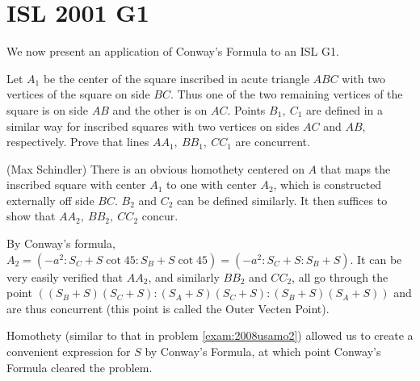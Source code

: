 \section{ISL 2001 G1}
\label{exam:2001islg1}
We now present an application of Conway's Formula to an ISL G1.

\secps


\begin{problem}[ISL 2001/G1]
  Let $A_1$ be the center of the square inscribed in acute triangle $ABC$ with two vertices of the square on side $BC$.  Thus one of the two remaining vertices of the square is on side $AB$ and the other is on $AC$. Points $B_1,\ C_1$ are defined in a similar way for inscribed squares with two vertices on sides $AC$ and $AB$, respectively. Prove that lines $AA_1,\ BB_1,\ CC_1$ are concurrent.
\end{problem}


\begin{soln}
  (Max Schindler) There is an obvious homothety centered on $A$ that maps the inscribed square with center $A_1$ to one with center $A_2$, which is constructed externally off side $BC$. $B_2$ and $C_2$ can be defined similarly. It then suffices to show that $AA_2,\ BB_2,\ CC_2$ concur.

By Conway's formula, $A_2=(-a^2:S_C+S\cot{45}:S_B+S\cot{45})=(-a^2:S_C+S:S_B+S)$. It can be very easily verified that $AA_2$, and similarly $BB_2$ and $CC_2$, all go through the point $((S_B+S)(S_C+S):(S_A+S)(S_C+S):(S_B+S)(S_A+S))$ and are thus concurrent (this point is called the Outer Vecten Point).
\end{soln}
\seccm
Homothety (similar to that in problem \ref{exam:2008usamo2}) allowed us to create a convenient expression for $S$ by Conway's Formula, at which point Conway's Formula cleared the problem.
